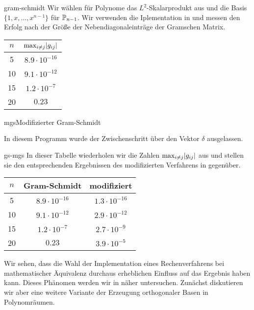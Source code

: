 \begin{Beispiel}{gram-schmidt}
  Wir wählen für Polynome das $L^2$-Skalarprodukt aus
   und die Basis $\{1,x,\dots,x^{n-1}\}$
  für $\P_{n-1}$. Wir verwenden die Iplementation in
   und messen den Erfolg nach der
  Größe der Nebendiagonaleinträge der Gramschen Matrix.
  \begin{center}
    \begin{tabular}{c|c}
      $n$ & $\max_{i\neq j} \abs{g_{ij}}$ \\
      \hline
      5 & $8.9\cdot 10^{-16}$ \\
      10 & $9.1\cdot 10^{-12}$ \\
      15 & $1.2\cdot 10^{-7}$ \\
      20 & $0.23$
    \end{tabular}
  \end{center}
\end{Beispiel}

\begin{Algorithmus*}{mgs}{Modifizierter Gram-Schmidt}
    
\end{Algorithmus*}

\begin{remark}
  In diesem Programm wurde der Zwischenschritt über den Vektor
$\delta$ ausgelassen.
\end{remark}

\begin{Beispiel}{gs-mgs}
  In dieser Tabelle wiederholen wir die Zahlen
  $\max_{i\neq j} \abs{g_{ij}}$ aus 
  und stellen sie den entsprechenden Ergebnissen des modifizierten
  Verfahrens in  gegenüber.
  \begin{center}
    \begin{tabular}{c|cc}
      $n$ &  Gram-Schmidt & modifiziert\\
      \hline
      5 & $8.9\cdot 10^{-16}$ & $1.3\cdot 10^{-16}$ \\
      10 & $9.1\cdot 10^{-12}$ & $2.9\cdot 10^{-12}$ \\
      15 & $1.2\cdot 10^{-7}$ & $2.7\cdot 10^{-9}$ \\
      20 & $0.23$ & $3.9\cdot 10^{-5}$
    \end{tabular}
  \end{center}
\end{Beispiel}

\begin{remark}
  Wir sehen, dass die Wahl der Implementation eines Rechenverfahrens
  bei mathematischer Äquivalenz durchaus erheblichen Einfluss auf das
  Ergebnis haben kann. Dieses Phänomen werden wir in
   näher untersuchen. Zunächst diskutieren wir
  aber eine weitere Variante der Erzeugung orthogonaler Basen in
  Polynomräumen.
\end{remark}

